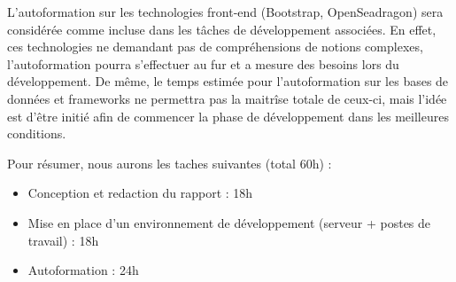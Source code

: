 	L'autoformation sur les technologies front-end (Bootstrap, OpenSeadragon) sera considérée comme incluse dans les tâches de développement associées. En effet, ces technologies ne demandant pas de compréhensions de notions complexes, l'autoformation pourra s'effectuer au fur et a mesure des besoins lors du développement.
	De même, le temps estimée pour l'autoformation sur les bases de données et frameworks ne permettra pas la maitrîse totale de ceux-ci, mais l'idée est d'être initié afin de commencer la phase de développement dans les meilleures conditions.

Pour résumer, nous aurons les taches suivantes (total 60h) :
\begin{itemize}
\item Conception et redaction du rapport : 18h
\item Mise en place d'un environnement de développement (serveur + postes de travail) : 18h
\item Autoformation : 24h
\end{itemize}


